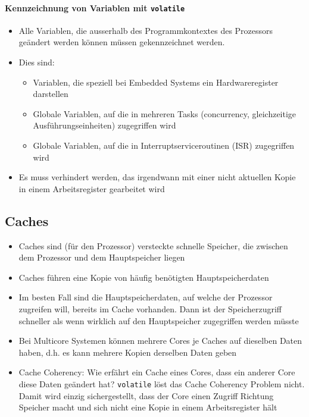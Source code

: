 \paragraph{Kennzeichnung von Variablen mit \lstinline{volatile}}
\begin{itemize}
	\item Alle Variablen, die ausserhalb des Programmkontextes des Prozessors geändert werden können müssen gekennzeichnet werden.
	\item Dies sind:
	\begin{itemize}
		\item Variablen, die speziell bei Embedded Systems ein Hardwareregister darstellen 
		\item Globale Variablen, auf die in mehreren Tasks (concurrency, gleichzeitige Ausführungseinheiten) zugegriffen wird 
		\item Globale Variablen, auf die in Interruptserviceroutinen (ISR) zugegriffen wird
	\end{itemize}
	\item Es muss verhindert werden, das irgendwann mit einer nicht aktuellen Kopie in einem Arbeitsregister gearbeitet wird
\end{itemize}

\subsection{Caches}
\begin{itemize}
	\item Caches sind (für den Prozessor) versteckte schnelle Speicher, die zwischen dem Prozessor und dem Hauptspeicher liegen 
	\item Caches führen eine Kopie von häufig benötigten Hauptspeicherdaten 
	\item Im besten Fall sind die Hauptspeicherdaten, auf welche der Prozessor zugreifen will, bereits im Cache vorhanden.  Dann ist der Speicherzugriff schneller als wenn wirklich auf den Hauptspeicher zugegriffen werden müsste
	\item Bei Multicore Systemen können mehrere Cores je Caches auf dieselben Daten haben, d.h. es kann mehrere Kopien derselben Daten geben 
	\item Cache Coherency: Wie erfährt ein Cache eines Cores, dass ein anderer Core diese Daten geändert hat? \lstinline{volatile} löst das Cache Coherency Problem nicht. Damit wird einzig sichergestellt, dass der Core einen Zugriff Richtung Speicher macht und sich nicht eine Kopie in einem Arbeitsregister hält
\end{itemize}

